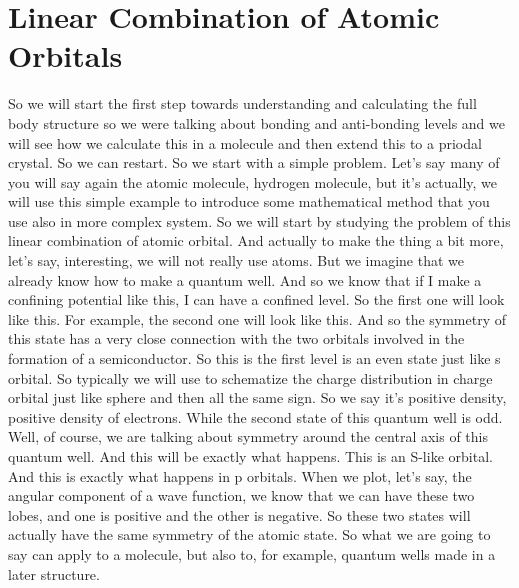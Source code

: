 \section{Linear Combination of Atomic Orbitals}
So we will start the first step towards understanding and calculating the full body structure so we were talking about bonding and anti-bonding levels and we will see how we calculate this in a molecule and then extend this to a priodal crystal. So we can restart. So we start with a simple problem.
Let's say many of you will say again the atomic molecule, hydrogen molecule, but it's actually, we will use this simple example to introduce some mathematical method that you use also in more complex system. So we will start by studying the problem of this linear combination of atomic orbital. And actually to make the thing a bit more, let's say, interesting, we will not really use atoms. But we imagine that we already know how to make a quantum well. And so we know that if I make a confining potential like this, I can have a confined level. So the first one will look like this. For example, the second one will look like this. And so the symmetry of this state has a very close connection with the two orbitals involved in the formation of a semiconductor. So this is the first level is an even state just like s orbital. So typically we will use to schematize the charge distribution in charge orbital just like sphere and then all the same sign. So we say it's positive density, positive density of electrons. While the second state of this quantum well is odd. Well, of course, we are talking about symmetry around the central axis of this quantum well. And this will be exactly what happens. This is an S-like orbital. And this is exactly what happens in p orbitals. When we plot, let's say, the angular component of a wave function, we know that we can have these two lobes, and one is positive and the other is negative. So these two states will actually have the same symmetry of the atomic state. So what we are going to say can apply to a molecule, but also to, for example, quantum wells made in a later structure.\\
